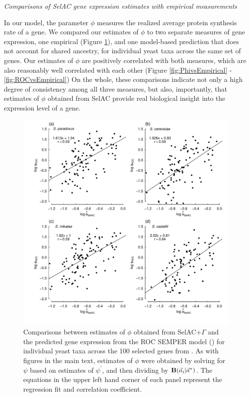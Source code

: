 \documentclass[12pt,letterpaper,fleqn]{article}
\renewcommand{\subsection}[1]{%
\bigskip
\begin{center}
\begin{large}
\normalfont\itshape #1
\end{large}
\end{center}}
\newcommand{\Funcaveci}{\ensuremath{\Func(\aveci|\aoptvec)}\xspace}
\newcommand{\Func}{\ensuremath{\text{\textbf{B}}}\xspace}
\newcommand{\selacplusgamma}{SelAC$+\Gamma$\xspace}
\newcommand{\aoptvec}{\ensuremath{\Vec{a}^*}\xspace}
\newcommand{\aveci}{\ensuremath{\Vec{a}_i}\xspace}
\newcommand{\psiprime}{\ensuremath{\psi^\prime}\xspace}
\begin{document}
\subsection{Comparisons of SelAC gene expression estimates with empirical measurements}

In our model, the parameter $\phi$ measures the realized average protein synthesis rate of a gene.
We compared our estimates of $\phi$ to two separate measures of gene expression, one empirical (Figure \ref{fig:PhivsROC}), and one model-based prediction that does not account for shared ancestry, for individual yeast taxa across the same set of genes.
Our estimates of $\phi$ are positively correlated with both measures, which are also reasonably well correlated with each other (Figure \ref{fig:PhivsEmpirical} - \ref{fig:ROCvsEmpirical})
On the whole, these comparisons indicate not only a high degree of consistency among all three measures, but also, importantly, that estimates of $\phi$ obtained from SelAC provide real biological insight into the expression level of a gene.

\begin{figure}[H]
  \centering
  \includegraphics[width=0.9\linewidth]{FIGURE_S1_SelACwG_vs_ROC_by_spp.pdf}
  \caption{Comparisons between estimates of $\phi$ obtained from \selacplusgamma and the predicted gene expression from the ROC SEMPER model (\citet{GilchristEtAl2015}) for individual yeast taxa across the 100 selected genes from \citet{SalichosAndRokas2013}.
        As with figures in the main text, estimates of $\phi$ were obtained by solving for $\psi$ based on estimates of $\psiprime$, and then dividing by \Funcaveci.
                The equations in the upper left hand corner of each panel represent the regression fit and correlation coefficient.
  }
  \label{fig:PhivsROC}
\end{figure}
\end{document}
